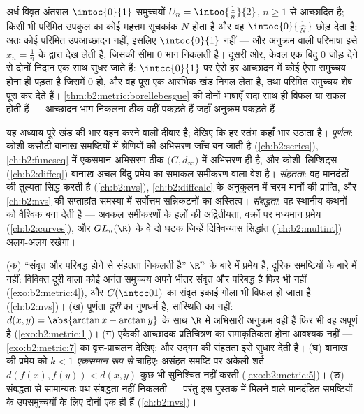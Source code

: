 \begin{example}[आच्छादनों पर संहतता पढ़ना]\label{ex:b2:metric:covers}
अर्ध-विवृत अंतराल $\intoc{0}{1}$  समुच्चयों $U_n = \intoo{\frac1n}{2}$, $n \geq 1$ से आच्छादित है; किसी
भी परिमित उपकुल का कोई महत्तम सूचकांक $N$ होता है और वह $\intoc{0}{\frac1N}$ छोड़ देता
है: अतः कोई परिमित उपआच्छादन नहीं, इसलिए $\intoc{0}{1}$  नहीं --- और अनुक्रम
वाली परिभाषा इसे $x_n = \frac1n$ के द्वारा देख लेती है, जिसकी सीमा $0$ भाग निकलती
है। दूसरी ओर, केवल एक बिंदु $0$ जोड़ देने से दोनों निदान एक साथ सुधर
जाते हैं: $\intcc{0}{1}$ पर ऐसे हर आच्छादन में कोई ऐसा समुच्चय होना ही पड़ता है
जिसमें $0$ हो, और वह पूरा एक आरंभिक खंड निगल लेता है, तथा परिमित
समुच्चय शेष पूरा कर देते हैं। \cref{thm:b2:metric:borellebesgue} की दोनों भाषाएँ सदा साथ ही विफल या
सफल होती हैं --- आच्छादन भाग निकलना ठीक वहीं पकड़ते हैं जहाँ अनुक्रम
पकड़ते हैं।
\end{example}

\begin{remark}[इसी खंड के भीतर के परिप्रेक्ष्य]\label{rem:b2:metric:perspectives}
यह अध्याय पूरे खंड की भार वहन करने वाली दीवार है; देखिए कि हर स्तंभ
कहाँ भार उठाता है। \emph{पूर्णता}: कोशी कसौटी बानाख समष्टियों में
श्रेणियों की अभिसरण-जाँच बन जाती है (\cref{ch:b2:series}), \cref{ch:b2:funcseq} में एकसमान अभिसरण ठीक
 $\bigl(C, d_\infty\bigr)$ में अभिसरण ही है, और कोशी--लिप्शिट्स (\cref{ch:b2:diffeq}) बानाख अचल बिंदु
प्रमेय का समाकल-समीकरण वाला वेश है। \emph{संहतता}: वह मानदंडों की
तुल्यता सिद्ध करती है (\cref{ch:b2:nvs}), \cref{ch:b2:diffcalc} के अनुकूलन में चरम मानों की प्राप्ति,
और \cref{ch:b2:nvs} की सप्ताहांत समस्या में सर्वोत्तम सन्निकटनों का अस्तित्व।
\emph{संबद्धता}: वह स्थानीय कथनों को वैश्विक बना देती है --- अवकल
समीकरणों के हलों की अद्वितीयता, वक्रों पर मध्यमान प्रमेय (\cref{ch:b2:curves}), और
$GL_n(\R)$ के वे दो घटक जिन्हें दिक्विन्यास सिद्धांत (\cref{ch:b2:multint}) अलग-अलग रखेगा।
\end{remark}

\begin{remark}[सामान्य भूलें]\label{rem:b2:metric:pitfalls}
(क) ``संवृत और परिबद्ध होने से संहतता निकलती है'' $\R^n$ के बारे में
प्रमेय है, दूरिक समष्टियों के बारे में नहीं: विविक्त दूरी वाला कोई अनंत
समुच्चय अपने भीतर संवृत और परिबद्ध है फिर भी  नहीं (\cref{exo:b2:metric:4}), और $C(\intcc01)$
का संवृत इकाई गोला भी विफल हो जाता है (\cref{ch:b2:nvs})। (ख) पूर्णता \emph{दूरी}
का गुणधर्म है, सांस्थिति का नहीं: $d(x,y) = \abs{\arctan x - \arctan y}$ के साथ $\R$ में अभिसारी अनुक्रम
वही हैं फिर भी वह अपूर्ण है (\cref{exo:b2:metric:1})। (ग)  एकैकी आच्छादक प्रतिचित्रण
का समाकृतिकता होना आवश्यक नहीं --- \cref{exo:b2:metric:7} का वृत्त-प्राचलन देखिए; और
उद्गम की संहतता इसे सुधार देती है। (घ) बानाख की प्रमेय को $k < 1$
\emph{एकसमान रूप से} चाहिए: असंहत समष्टि पर अकेली शर्त $d(f(x), f(y)) < d(x,y)$ कुछ भी
सुनिश्चित नहीं करती (\cref{exo:b2:metric:5})। (ङ) संबद्धता से सामान्यतः पथ-संबद्धता नहीं
निकलती --- परंतु इस पुस्तक में मिलने वाले मानदंडित समष्टियों के 
उपसमुच्चयों के लिए दोनों एक ही हैं (\cref{ch:b2:nvs})।
\end{remark}

